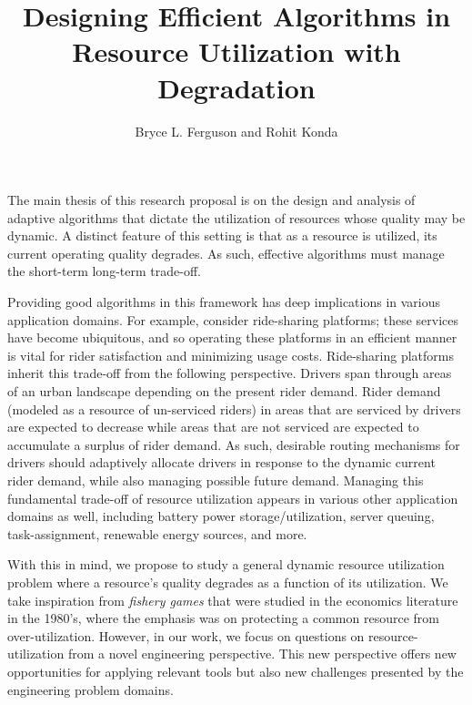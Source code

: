 \documentclass[letterpaper, 10 pt, conference]{ieeeconf}
\begin{document}
\title{Designing Efficient Algorithms in Resource Utilization with Degradation}
\author{Bryce L. Ferguson and Rohit Konda}

\maketitle
\thispagestyle{empty}

The main thesis of this research proposal is on the design and analysis of adaptive algorithms that dictate the utilization of resources whose quality may be dynamic. A distinct feature of this setting is that as a resource is utilized, its current operating quality degrades. As such, effective algorithms must manage the short-term long-term trade-off. 

Providing good algorithms in this framework has deep implications in various application domains. For example, consider ride-sharing platforms; these services have become ubiquitous, and so operating these platforms in an efficient manner is vital for rider satisfaction and minimizing usage costs. 
Ride-sharing platforms inherit this trade-off from the following perspective. Drivers span through areas of an urban landscape depending on the present rider demand. Rider demand (modeled as a resource of un-serviced riders) in areas that are serviced by drivers are expected to decrease while areas that are not serviced are expected to accumulate a surplus of rider demand. As such, desirable routing mechanisms for drivers should adaptively allocate drivers in response to the dynamic current rider demand, while also managing possible future demand. Managing this fundamental trade-off of resource utilization appears in various other application domains as well, including battery power storage/utilization, server queuing, task-assignment, renewable energy sources, and more.

With this in mind, we propose to study a general dynamic resource utilization problem where a resource's quality degrades as a function of its utilization. We take inspiration from \emph{fishery games} that were studied in the economics literature in the 1980's, where the emphasis  was on protecting a common resource from over-utilization. However, in our work, we focus on questions on resource-utilization from a novel engineering perspective. This new perspective offers new opportunities for applying relevant tools but also new challenges presented by the engineering problem domains.
\end{document}
